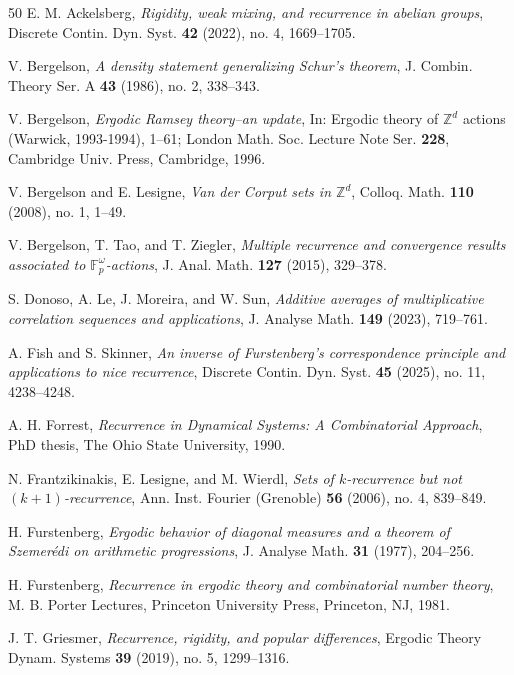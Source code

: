 \documentclass[reqno,a4paper,12pt]{amsart}
\theoremstyle{definition}
\theoremstyle{remark}
\def \Z {\mathbb{Z}}
\begin{document}
\begin{thebibliography}{50}
 E. M. Ackelsberg, \emph{Rigidity, weak mixing, and recurrence in abelian groups}, Discrete Contin. Dyn. Syst. \textbf{42} (2022), no. 4, 1669--1705.

 V. Bergelson, \emph{A density statement generalizing Schur's theorem}, J. Combin. Theory Ser. A \textbf{43} (1986), no. 2, 338--343.

 V. Bergelson, \emph{Ergodic Ramsey theory--an update}, In: Ergodic theory of $\Z^d$ actions (Warwick, 1993-1994), 1--61; London Math. Soc. Lecture Note Ser. \textbf{228}, Cambridge Univ. Press, Cambridge, 1996.

 V. Bergelson and E. Lesigne, \emph{Van der Corput sets in $\Z^d$}, Colloq. Math. \textbf{110} (2008), no. 1, 1--49.

 V. Bergelson, T. Tao, and T. Ziegler, \emph{Multiple recurrence and convergence results associated to $\mathbb{F}^\omega_p$-actions}, J. Anal. Math. \textbf{127} (2015), 329--378.

 S. Donoso, A. Le, J. Moreira, and W. Sun, \emph{Additive averages of multiplicative correlation sequences and applications}, J. Analyse Math. \textbf{149} (2023), 719--761.

 A. Fish and S. Skinner, \emph{An inverse of Furstenberg's correspondence principle and applications to nice recurrence}, Discrete Contin. Dyn. Syst. \textbf{45} (2025), no. 11, 4238--4248.

 A. H. Forrest, \emph{Recurrence in Dynamical Systems: A Combinatorial Approach}, PhD thesis, The Ohio
State University, 1990.

 N. Frantzikinakis, E. Lesigne, and M. Wierdl, \emph{Sets of $k$-recurrence but not $(k+1)$-recurrence}, Ann. Inst. Fourier (Grenoble) \textbf{56} (2006), no. 4, 839--849.

 H. Furstenberg, \emph{Ergodic behavior of diagonal measures and a theorem of Szemer\'edi on arithmetic progressions}, J. Analyse Math. \textbf{31} (1977), 204--256.

 H. Furstenberg, \emph{Recurrence in ergodic theory and combinatorial number theory}, M. B. Porter Lectures, Princeton University Press, Princeton, NJ, 1981.

 J. T. Griesmer, \emph{Recurrence, rigidity, and popular differences}, Ergodic Theory Dynam. Systems \textbf{39} (2019), no. 5, 1299--1316.


\end{thebibliography}
\end{document}
